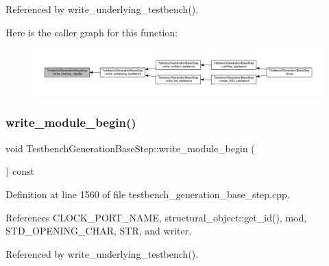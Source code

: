 Referenced by write\+\_\+underlying\+\_\+testbench().

Here is the caller graph for this function\+:
\nopagebreak
\begin{figure}[H]
\begin{center}
\leavevmode
\includegraphics[width=350pt]{dc/d02/classTestbenchGenerationBaseStep_a5c3f6e20a10e10fd2abded2de983d6ad_icgraph}
\end{center}
\end{figure}
\mbox{\label{classTestbenchGenerationBaseStep_abdf8e7f71d552b9d0fc929247fb1e44a}} 
\subsubsection{\texorpdfstring{write\+\_\+module\+\_\+begin()}{write\_module\_begin()}}
{\footnotesize\ttfamily void Testbench\+Generation\+Base\+Step\+::write\+\_\+module\+\_\+begin (\begin{DoxyParamCaption}{ }\end{DoxyParamCaption}) const\hspace{0.3cm}{\ttfamily [protected]}}



Definition at line 1560 of file testbench\+\_\+generation\+\_\+base\+\_\+step.\+cpp.



References C\+L\+O\+C\+K\+\_\+\+P\+O\+R\+T\+\_\+\+N\+A\+ME, structural\+\_\+object\+::get\+\_\+id(), mod, S\+T\+D\+\_\+\+O\+P\+E\+N\+I\+N\+G\+\_\+\+C\+H\+AR, S\+TR, and writer.



Referenced by write\+\_\+underlying\+\_\+testbench().

